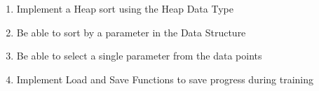 \begin{flushleft}
\begin{enumerate}
\begin{enumerate}
\begin{enumerate}
                        \item Implement a Heap sort using the Heap Data Type
                        \item Be able to sort by a parameter in the Data Structure
                        \item Be able to select a single parameter from the data points
                        \item Implement Load and Save Functions to save progress during training
                    \end{enumerate}   
            \end{enumerate}
    \end{enumerate}
\end{flushleft}